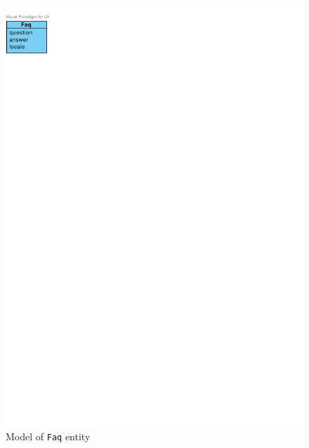 \begin{figure}[h]
    \centering
        \includegraphics[trim=0 740 510 30, clip, keepaspectratio]{./images/domain-faq-entity.pdf}
    \caption{Model of \texttt{Faq} entity}
    \label{fig:domain-faq-entity}
\end{figure}

\faketext[2]
